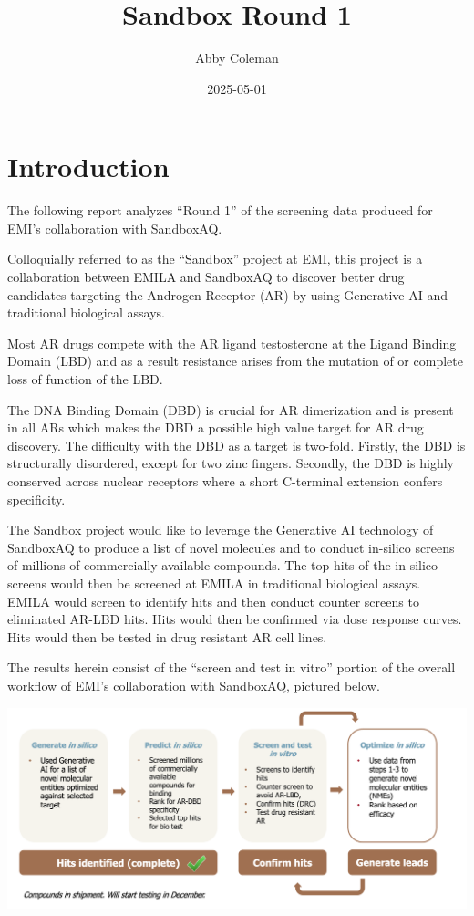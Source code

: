 \documentclass[
]{article}
\title{Sandbox Round 1}
\author{Abby Coleman}
\date{2025-05-01}
\begin{document}
\maketitle

{
\setcounter{tocdepth}{2}
\tableofcontents
}
\newpage

\section{Introduction}\label{introduction}

The following report analyzes ``Round 1'' of the screening data produced
for EMI's collaboration with SandboxAQ.

Colloquially referred to as the ``Sandbox'' project at EMI, this project
is a collaboration between EMILA and SandboxAQ to discover better drug
candidates targeting the Androgen Receptor (AR) by using Generative AI
and traditional biological assays.

Most AR drugs compete with the AR ligand testosterone at the Ligand
Binding Domain (LBD) and as a result resistance arises from the mutation
of or complete loss of function of the LBD.

The DNA Binding Domain (DBD) is crucial for AR dimerization and is
present in all ARs which makes the DBD a possible high value target for
AR drug discovery. The difficulty with the DBD as a target is two-fold.
Firstly, the DBD is structurally disordered, except for two zinc
fingers. Secondly, the DBD is highly conserved across nuclear receptors
where a short C-terminal extension confers specificity.

The Sandbox project would like to leverage the Generative AI technology
of SandboxAQ to produce a list of novel molecules and to conduct
in-silico screens of millions of commercially available compounds. The
top hits of the in-silico screens would then be screened at EMILA in
traditional biological assays. EMILA would screen to identify hits and
then conduct counter screens to eliminated AR-LBD hits. Hits would then
be confirmed via dose response curves. Hits would then be tested in drug
resistant AR cell lines.

The results herein consist of the ``screen and test in vitro'' portion
of the overall workflow of EMI's collaboration with SandboxAQ, pictured
below.

\begin{center}\includegraphics[width=1\linewidth]{../images/overall_workflow} \end{center}
\end{document}
